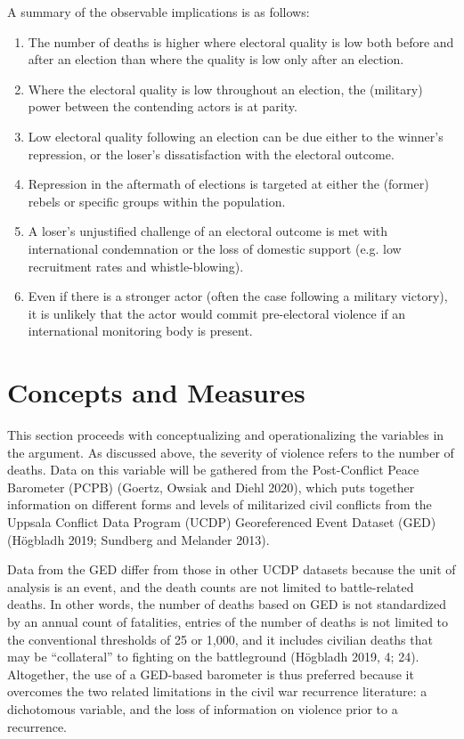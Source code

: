 \documentclass [11pt]{article}
\begin{document}
\noindent A summary of the observable implications is as follows:

\begin{enumerate}
\item The number of deaths is higher where electoral quality is low both before and after an election than where the quality is low only after an election.
\item Where the electoral quality is low throughout an election, the (military) power between the contending actors is at parity.
\item Low electoral quality following an election can be due either to the winner's repression, or the loser's dissatisfaction with the electoral outcome.
\item Repression in the aftermath of elections is targeted at either the (former) rebels or specific groups within the population.
\item A loser's unjustified challenge of an electoral outcome is met with international condemnation or the loss of domestic support (e.g. low recruitment rates and whistle-blowing).
\item Even if there is a stronger actor (often the case following a military victory), it is unlikely that the actor would commit pre-electoral violence if an international monitoring body is present.
\end{enumerate}

\section*{Concepts and Measures} %

This section proceeds with conceptualizing and operationalizing the variables in the argument. As discussed above, the severity of violence refers to the number of deaths. Data on this variable will be gathered from the Post-Conflict Peace Barometer (PCPB) (Goertz, Owsiak and Diehl 2020), which puts together information on different forms and levels of militarized civil conflicts from the Uppsala Conflict Data Program (UCDP) Georeferenced Event Dataset (GED) (Högbladh 2019; Sundberg and Melander 2013).

Data from the GED differ from those in other UCDP datasets because the unit of analysis is an event, and the death counts are not limited to battle-related deaths. In other words, the number of deaths based on GED is not standardized by an annual count of fatalities, entries of the number of deaths is not limited to the conventional thresholds of 25 or 1,000, and it includes civilian deaths that may be ``collateral'' to fighting on the battleground (Högbladh 2019, 4; 24). Altogether, the use of a GED-based barometer is thus preferred because it overcomes the two related limitations in the civil war recurrence literature: a dichotomous variable, and the loss of information on violence prior to a recurrence.
\end{document}

